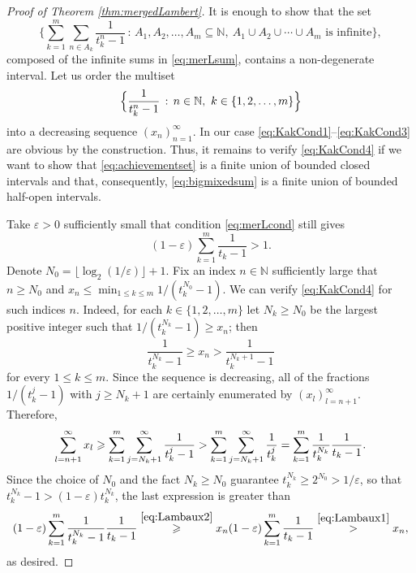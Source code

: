 \documentclass[11pt,letterpaper,reqno]{amsart}
\numberwithin{equation}{section}
\theoremstyle{definition}
\numberwithin{equation}{section}
\begin{document}
\begin{proof}[Proof of Theorem \ref{thm:mergedLambert}]
It is enough to show that the set
\begin{equation}\label{eq:bigmixedsum} 
\biggl\{  \sum_{k=1}^{m} \sum_{n\in A_k} \frac{1}{t_k^n-1} \,:\, A_1,A_2,\ldots,A_m\subseteq\mathbb{N},\ A_1\cup A_2\cup \cdots\cup A_m\text{ is infinite} \biggr\}, 
\end{equation}
composed of the infinite sums in \eqref{eq:merLsum}, contains a non-degenerate interval.
Let us order the multiset
\[ \Bigl\{ \frac{1}{t_k^n-1} \,:\, n\in\mathbb{N},\ k\in\{1,2,\ldots,m\}  \Bigr\} \]
into a decreasing sequence $(x_n)_{n=1}^{\infty}$.
In our case \eqref{eq:KakCond1}--\eqref{eq:KakCond3} are obvious by the construction. 
Thus, it remains to verify \eqref{eq:KakCond4} if we want to show that \eqref{eq:achievementset} is a finite union of bounded closed intervals and that, consequently, \eqref{eq:bigmixedsum} is a finite union of bounded half-open intervals.

Take $\varepsilon>0$ sufficiently small that condition \eqref{eq:merLcond} still gives
\begin{equation}\label{eq:Lambaux1}
(1-\varepsilon)\sum_{k=1}^{m} \frac{1}{t_k-1} > 1.
\end{equation}
Denote $N_0 = \lfloor \log_2 (1/\varepsilon) \rfloor +1$.
Fix an index $n\in\mathbb{N}$ sufficiently large that $n\geqslant N_0$ and $x_n \leqslant \min_{1\leqslant k\leqslant m} 1/(t_k^{N_0}-1)$. We can verify \eqref{eq:KakCond4} for such indices $n$.
Indeed, for each $k\in\{1,2,\ldots,m\}$ let $N_k\geqslant N_0$ be the largest positive integer such that $1/(t_k^{N_k}-1) \geqslant x_n$; then
\begin{equation}\label{eq:Lambaux2}
\frac{1}{t_k^{N_k}-1} \geqslant x_n > \frac{1}{t_k^{N_k+1}-1}
\end{equation}
for every $1\leqslant k\leqslant m$.
Since the sequence is decreasing, all of the fractions $1/(t_k^{j}-1)$ with $j\geqslant N_k+1$ are certainly enumerated by $(x_l)_{l=n+1}^{\infty}$.
Therefore,
\[ \sum_{l=n+1}^{\infty} x_l
\geqslant \sum_{k=1}^{m} \sum_{j=N_k+1}^{\infty} \frac{1}{t_k^j-1}
> \sum_{k=1}^{m} \sum_{j=N_k+1}^{\infty} \frac{1}{t_k^j} \\
= \sum_{k=1}^{m} \frac{1}{t_k^{N_k}} \frac{1}{t_k-1}. \]
Since the choice of $N_0$ and the fact $N_k\geqslant N_0$ guarantee $t_k^{N_k} \geqslant 2^{N_0} > 1/\varepsilon$, so that $t_k^{N_k} - 1 > (1-\varepsilon) t_k^{N_k}$, the last expression is greater than
\[ (1-\varepsilon) \sum_{k=1}^{m} \frac{1}{t_k^{N_k}-1} \frac{1}{t_k-1}
\stackrel{\eqref{eq:Lambaux2}}{\geqslant} x_n (1-\varepsilon) \sum_{k=1}^{m} \frac{1}{t_k-1}
\stackrel{\eqref{eq:Lambaux1}}{>} x_n, \]
as desired.
\end{proof}
\end{document}
